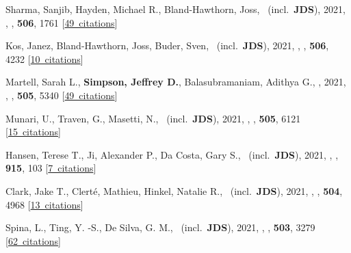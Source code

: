 \item[{\color{numcolor}\scriptsize60}] Sharma, Sanjib, Hayden, Michael R., Bland-Hawthorn, Joss, \etal\ (incl.\ \textbf{JDS}), 2021, , \mnras, \textbf{506}, 1761 [\href{https://ui.adsabs.harvard.edu/#abs/2021MNRAS.506.1761S}{49~citations}]

\item[{\color{numcolor}\scriptsize59}] Kos, Janez, Bland-Hawthorn, Joss, Buder, Sven, \etal\ (incl.\ \textbf{JDS}), 2021, , \mnras, \textbf{506}, 4232 [\href{https://ui.adsabs.harvard.edu/#abs/2021MNRAS.506.4232K}{10~citations}]

\item[{\color{numcolor}\scriptsize58}] Martell, Sarah L., \textbf{Simpson, Jeffrey D.}, Balasubramaniam, Adithya G., \etal, 2021, , \mnras, \textbf{505}, 5340 [\href{https://ui.adsabs.harvard.edu/#abs/2021MNRAS.505.5340M}{49~citations}]

\item[{\color{numcolor}\scriptsize57}] Munari, U., Traven, G., Masetti, N., \etal\ (incl.\ \textbf{JDS}), 2021, , \mnras, \textbf{505}, 6121 [\href{https://ui.adsabs.harvard.edu/#abs/2021MNRAS.505.6121M}{15~citations}]

\item[{\color{numcolor}\scriptsize56}] Hansen, Terese T., Ji, Alexander P., Da Costa, Gary S., \etal\ (incl.\ \textbf{JDS}), 2021, , \apj, \textbf{915}, 103 [\href{https://ui.adsabs.harvard.edu/#abs/2021ApJ...915..103H}{7~citations}]

\item[{\color{numcolor}\scriptsize55}] Clark, Jake T., Clert{\'e}, Mathieu, Hinkel, Natalie R., \etal\ (incl.\ \textbf{JDS}), 2021, , \mnras, \textbf{504}, 4968 [\href{https://ui.adsabs.harvard.edu/#abs/2021MNRAS.504.4968C}{13~citations}]

\item[{\color{numcolor}\scriptsize54}] Spina, L., Ting, Y. -S., De Silva, G. M., \etal\ (incl.\ \textbf{JDS}), 2021, , \mnras, \textbf{503}, 3279 [\href{https://ui.adsabs.harvard.edu/#abs/2021MNRAS.503.3279S}{62~citations}]

